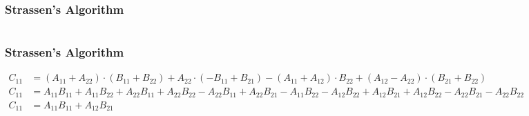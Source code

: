 \begin{frame}
  \frametitle{Strassen's Algorithm}
  \begin{columns}
    \begin{column}{0.5\textwidth}
    \end{column}

    \begin{column}{0.5\textwidth}
    \end{column}
\end{columns}



\end{frame}

\begin{frame}
  \frametitle{Strassen's Algorithm}
  \centering
  \tiny
  \begin{math}
  \begin{aligned}
    C_{11} &= (A_{11} + A_{22}) \cdot (B_{11} + B_{22}) + A_{22} \cdot (-B_{11}+B_{21}) - (A_{11} + A_{12}) \cdot B_{22} + (A_{12} - A_{22}) \cdot (B_{21} + B_{22}) \\
    C_{11} &= A_{11}B_{11} + A_{11}B_{22} + A_{22}B_{11} + A_{22}B_{22} -A_{22}B_{11}+A_{22}B_{21} - A_{11}B_{22} - A_{12}B_{22}+ A_{12}B_{21} + A_{12}B_{22} - A_{22}B_{21} - A_{22}B_{22} \\
    C_{11} &= A_{11}B_{11} + A_{12}B_{21}
  \end{aligned}
  \end{math}

\end{frame}

